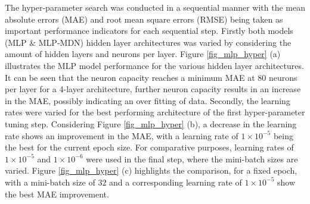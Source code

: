 \documentclass[a4paper,fleqn]{cas-sc}
\begin{document}
The hyper-parameter search was conducted in a sequential manner with the mean absolute errors (MAE) and root mean square errors (RMSE) being taken as important performance indicators for each sequential step. Firstly both models (MLP \& MLP-MDN) hidden layer architectures was varied by considering the amount of hidden layers and neurons per layer. Figure \ref{fig_mlp_hyper} (a) illustrates the MLP model performance for the various hidden layer architectures. It can be seen that the neuron capacity reaches a minimum MAE at 80 neurons per layer for a 4-layer architecture, further neuron capacity results in an increase in the MAE, possibly indicating an over fitting of data. Secondly, the learning rates were varied for the best performing architecture of the first hyper-parameter tuning step. Considering Figure \ref{fig_mlp_hyper} (b), a decrease in the learning rate shows an improvement in the MAE, with a learning rate of $1\times10^{-5}$ being the best for the current epoch size. For comparative purposes, learning rates of $1\times10^{-5}$ and $1\times10^{-6}$ were used in the final step, where the mini-batch sizes are varied. Figure \ref{fig_mlp_hyper} (c) highlights the comparison, for a fixed epoch, with a mini-batch size of 32 and a corresponding learning rate of $1\times10^{-5}$ show the best MAE improvement.\\
\end{document}
